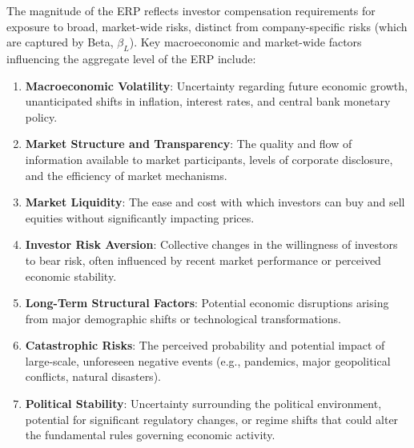 The magnitude of the ERP reflects investor compensation requirements for exposure to broad, market-wide risks, distinct from company-specific risks (which are captured by Beta, \(\beta_L\)). Key macroeconomic and market-wide factors influencing the aggregate level of the ERP include:
\begin{enumerate}
    \item \textbf{Macroeconomic Volatility}: Uncertainty regarding future economic growth, unanticipated shifts in inflation, interest rates, and central bank monetary policy.
    \item \textbf{Market Structure and Transparency}: The quality and flow of information available to market participants, levels of corporate disclosure, and the efficiency of market mechanisms.
    \item \textbf{Market Liquidity}: The ease and cost with which investors can buy and sell equities without significantly impacting prices.
    \item \textbf{Investor Risk Aversion}: Collective changes in the willingness of investors to bear risk, often influenced by recent market performance or perceived economic stability.
    \item \textbf{Long-Term Structural Factors}: Potential economic disruptions arising from major demographic shifts or technological transformations.
    \item \textbf{Catastrophic Risks}: The perceived probability and potential impact of large-scale, unforeseen negative events (e.g., pandemics, major geopolitical conflicts, natural disasters).
    \item \textbf{Political Stability}: Uncertainty surrounding the political environment, potential for significant regulatory changes, or regime shifts that could alter the fundamental rules governing economic activity.
\end{enumerate}

